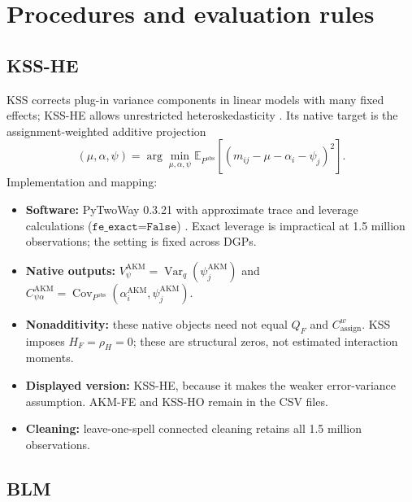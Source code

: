 \documentclass[11pt]{article}
\newcommand{\E}{\mathbb{E}}
\newcommand{\Var}{\operatorname{Var}}
\newcommand{\Cov}{\operatorname{Cov}}
\newcommand{\QF}{Q_F}
\newcommand{\HF}{H_F}
\newcommand{\rhoH}{\rho_H}
\newcommand{\Cassign}{C^{w}_{\mathrm{assign}}}
\begin{document}
\section{Procedures and evaluation rules}

\subsection{KSS-HE}

KSS corrects plug-in variance components in linear models with many fixed
effects; KSS-HE allows unrestricted heteroskedasticity \cite{kss2020}.  Its
native target is the assignment-weighted additive projection
\begin{equation}
(\mu,\alpha,\psi)=\arg\min_{\mu,\alpha,\psi}
\E_{P^{\mathrm{obs}}}[(m_{ij}-\mu-\alpha_i-\psi_j)^2]. \label{eq:kssprojection}
\end{equation}
Implementation and mapping:
\begin{itemize}
\item \textbf{Software:} PyTwoWay 0.3.21 with approximate trace and leverage
calculations ($\texttt{fe\_exact=False}$) \cite{pytwoway}.  Exact leverage is
impractical at 1.5 million observations; the setting is fixed across DGPs.
\item \textbf{Native outputs:}
$V_{\psi}^{\mathrm{AKM}}=\Var_q(\psi_j^{\mathrm{AKM}})$ and
$C_{\psi\alpha}^{\mathrm{AKM}}=
\Cov_{P^{\mathrm{obs}}}(\alpha_i^{\mathrm{AKM}},
\psi_j^{\mathrm{AKM}})$.
\item \textbf{Nonadditivity:} these native objects need not equal $\QF$ and
$\Cassign$.  KSS imposes $\HF=\rhoH=0$; these are structural zeros, not
estimated interaction moments.
\item \textbf{Displayed version:} KSS-HE, because it makes the weaker
error-variance assumption.  AKM-FE and KSS-HO remain in the CSV files.
\item \textbf{Cleaning:} leave-one-spell connected cleaning retains all 1.5
million observations.
\end{itemize}

\subsection{BLM}
\end{document}
